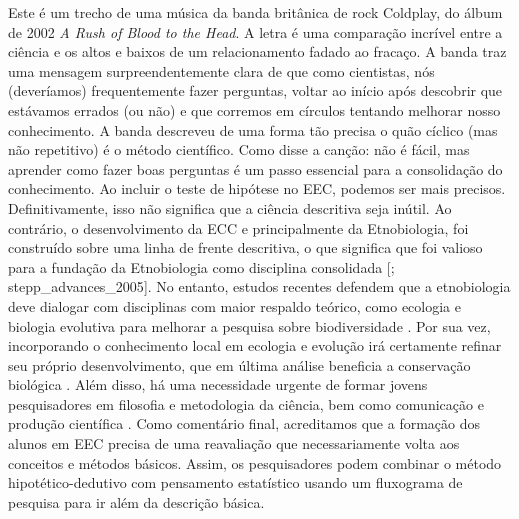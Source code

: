 \documentclass[
]{book}
\begin{document}
Este é um trecho de uma música da banda britânica de rock Coldplay, do álbum de 2002 \emph{A Rush of Blood to the Head}. A letra é uma comparação incrível entre a ciência e os altos e baixos de um relacionamento fadado ao fracaço. A banda traz uma mensagem surpreendentemente clara de que como cientistas, nós (deveríamos) frequentemente fazer perguntas, voltar ao início após descobrir que estávamos errados (ou não) e que corremos em círculos tentando melhorar nosso conhecimento. A banda descreveu de uma forma tão precisa o quão cíclico (mas não repetitivo) é o método científico. Como disse a canção: não é fácil, mas aprender como fazer boas perguntas é um passo essencial para a consolidação do conhecimento. Ao incluir o teste de hipótese no EEC, podemos ser mais precisos. Definitivamente, isso não significa que a ciência descritiva seja inútil. Ao contrário, o desenvolvimento da ECC e principalmente da Etnobiologia, foi construído sobre uma linha de frente descritiva, o que significa que foi valioso para a fundação da Etnobiologia como disciplina consolidada {[}\citet{ethnobiology_working_group_intellectual_2003}; stepp\_advances\_2005{]}. No entanto, estudos recentes defendem que a etnobiologia deve dialogar com disciplinas com maior respaldo teórico, como ecologia e biologia evolutiva para melhorar a pesquisa sobre biodiversidade \citep{albuquerque_what_2017}. Por sua vez, incorporando o conhecimento local em ecologia e evolução irá certamente refinar seu próprio desenvolvimento, que em última análise beneficia a conservação biológica \citep{saslis-lagoudakis_ethnobiology:_2013}. Além disso, há uma necessidade urgente de formar jovens pesquisadores em filosofia e metodologia da ciência, bem como comunicação e produção científica \citep{albuquerque_how_2013}. Como comentário final, acreditamos que a formação dos alunos em EEC precisa de uma reavaliação que necessariamente volta aos conceitos e métodos básicos. Assim, os pesquisadores podem combinar o método hipotético-dedutivo com pensamento estatístico usando um fluxograma de pesquisa para ir além da descrição básica.
\end{document}
